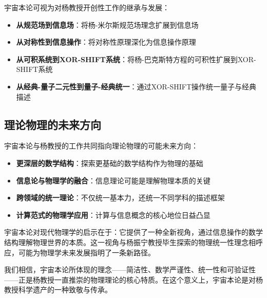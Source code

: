宇宙本论可视为对杨教授开创性工作的继承与发展：

\begin{itemize}
  \item \textbf{从规范场到信息场}：将杨-米尔斯规范场理念扩展到信息场
  \item \textbf{从对称性到信息操作}：将对称性原理深化为信息操作原理
  \item \textbf{从可积系统到XOR-SHIFT系统}：将杨-巴克斯特方程的可积性扩展到XOR-SHIFT系统
  \item \textbf{从经典-量子二元性到量子-经典统一}：通过XOR-SHIFT操作统一量子与经典描述
\end{itemize}

\subsection{理论物理的未来方向}

宇宙本论与杨教授的工作共同指向理论物理的可能未来方向：

\begin{itemize}
  \item \textbf{更深层的数学结构}：探索更基础的数学结构作为物理的基础
  \item \textbf{信息论与物理学的融合}：信息理论可能是理解物理本质的关键
  \item \textbf{跨领域的统一理论}：不仅统一基本力，还统一不同学科的描述框架
  \item \textbf{计算范式的物理学应用}：计算与信息概念的核心地位日益凸显
\end{itemize}

宇宙本论对现代物理学的启示在于：它提供了一种全新视角，通过信息操作的数学结构理解物理世界的本质。这一视角与杨振宁教授毕生探索的物理统一性理念相呼应，可能为物理学未来发展指明了一条新路径。

我们相信，宇宙本论所体现的理念——简洁性、数学严谨性、统一性和可验证性——正是杨教授一直推崇的物理理论的核心特质。在这个意义上，宇宙本论是对杨教授科学遗产的一种致敬与传承。 